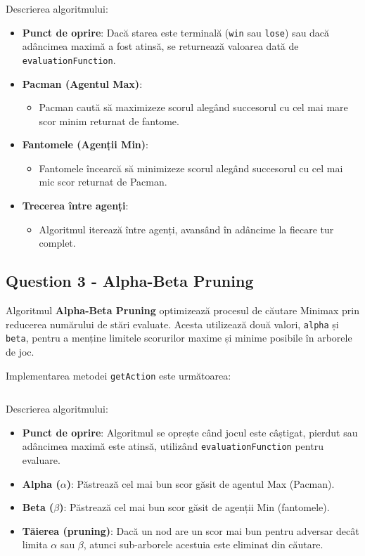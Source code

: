 \par Descrierea algoritmului:
\begin{itemize}
	\item \textbf{Punct de oprire}: Dacă starea este terminală (\texttt{win} sau \texttt{lose}) sau dacă adâncimea maximă a fost atinsă, se returnează valoarea dată de \texttt{evaluationFunction}.
	\item \textbf{Pacman (Agentul Max)}:
	\begin{itemize}
		\item Pacman caută să maximizeze scorul alegând succesorul cu cel mai mare scor minim returnat de fantome.
	\end{itemize}
	\item \textbf{Fantomele (Agenții Min)}:
	\begin{itemize}
		\item Fantomele încearcă să minimizeze scorul alegând succesorul cu cel mai mic scor returnat de Pacman.
	\end{itemize}
	\item \textbf{Trecerea între agenți}: 
	\begin{itemize}
		\item Algoritmul iterează între agenți, avansând în adâncime la fiecare tur complet.
	\end{itemize}
\end{itemize}

\subsection{Question 3 - Alpha-Beta Pruning}
\par Algoritmul \textbf{Alpha-Beta Pruning} optimizează procesul de căutare Minimax prin reducerea numărului de stări evaluate. Acesta utilizează două valori, \texttt{alpha} și \texttt{beta}, pentru a menține limitele scorurilor maxime și minime posibile în arborele de joc.

\par Implementarea metodei \texttt{getAction} este următoarea:
\inputminted[linenos]{python}{code/alpha_beta_pruning.py}

\par Descrierea algoritmului:
\begin{itemize}
	\item \textbf{Punct de oprire}: Algoritmul se oprește când jocul este câștigat, pierdut sau adâncimea maximă este atinsă, utilizând \texttt{evaluationFunction} pentru evaluare.
	\item \textbf{Alpha (\( \alpha \))}: Păstrează cel mai bun scor găsit de agentul Max (Pacman).
	\item \textbf{Beta (\( \beta \))}: Păstrează cel mai bun scor găsit de agenții Min (fantomele).
	\item \textbf{Tăierea (pruning)}: Dacă un nod are un scor mai bun pentru adversar decât limita \( \alpha \) sau \( \beta \), atunci sub-arborele acestuia este eliminat din căutare.
\end{itemize}

